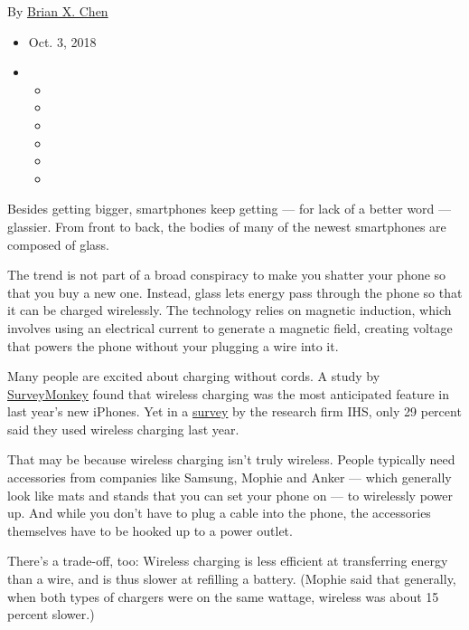 By \href{https://www.nytimes3xbfgragh.onion/by/brian-x-chen}{Brian X.
Chen}

\begin{itemize}
\item
  Oct. 3, 2018
\item
  \begin{itemize}
  \item
  \item
  \item
  \item
  \item
  \item
  \end{itemize}
\end{itemize}

Besides getting bigger, smartphones keep getting --- for lack of a
better word --- glassier. From front to back, the bodies of many of the
newest smartphones are composed of glass.

The trend is not part of a broad conspiracy to make you shatter your
phone so that you buy a new one. Instead, glass lets energy pass through
the phone so that it can be charged wirelessly. The technology relies on
magnetic induction, which involves using an electrical current to
generate a magnetic field, creating voltage that powers the phone
without your plugging a wire into it.

Many people are excited about charging without cords. A study by
\href{https://www.surveymonkey.com/mp/survey-methodology/}{SurveyMonkey}
found that wireless charging was the most anticipated feature in last
year's new iPhones. Yet in a
\href{https://technology.ihs.com/600120/half-a-billion-smartphones-and-other-devices-with-wireless-power-technology-shipped-in-2017-ihs-markit-says}{survey}
by the research firm IHS, only 29 percent said they used wireless
charging last year.

That may be because wireless charging isn't truly wireless. People
typically need accessories from companies like Samsung, Mophie and Anker
--- which generally look like mats and stands that you can set your
phone on --- to wirelessly power up. And while you don't have to plug a
cable into the phone, the accessories themselves have to be hooked up to
a power outlet.

There's a trade-off, too: Wireless charging is less efficient at
transferring energy than a wire, and is thus slower at refilling a
battery. (Mophie said that generally, when both types of chargers were
on the same wattage, wireless was about 15 percent slower.)

